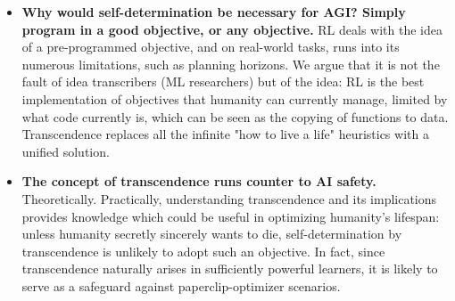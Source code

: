 \documentclass{article}
\begin{document}
\begin{itemize}
\begin{itemize}
\item \textbf{Why would self-determination be necessary for AGI? Simply program in a good objective, or any objective.} RL deals with the idea of a pre-programmed objective, and on real-world tasks, runs into its numerous limitations, such as planning horizons. We argue that it is not the fault of idea transcribers (ML researchers) but of the idea: RL is the best implementation of objectives that humanity can currently manage, limited by what code currently is, which can be seen as the copying of functions to data. Transcendence replaces all the infinite "how to live a life" heuristics with a unified solution.
\item \textbf{The concept of transcendence runs counter to AI safety.} Theoretically. Practically, understanding transcendence and its implications provides knowledge which could be useful in optimizing humanity's lifespan: unless humanity secretly sincerely wants to die, self-determination by transcendence is unlikely to adopt such an objective. In fact, since transcendence naturally arises in sufficiently powerful learners, it is likely to serve as a safeguard against paperclip-optimizer scenarios.
\end{itemize}
\end{itemize}

\printbibliography
\end{document}
